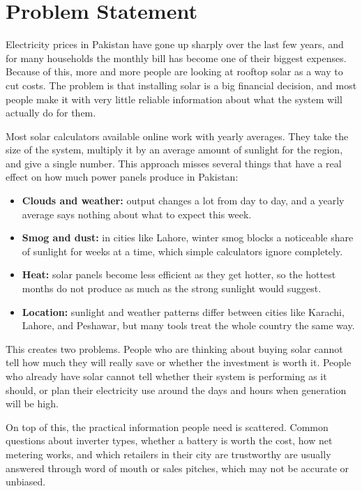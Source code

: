 \documentclass[11pt,a4paper]{article}
\begin{document}
\section{Problem Statement}

Electricity prices in Pakistan have gone up sharply over the last few years, and for many households the monthly bill has become one of their biggest expenses. Because of this, more and more people are looking at rooftop solar as a way to cut costs. The problem is that installing solar is a big financial decision, and most people make it with very little reliable information about what the system will actually do for them.
 
Most solar calculators available online work with yearly averages. They take the size of the system, multiply it by an average amount of sunlight for the region, and give a single number. This approach misses several things that have a real effect on how much power panels produce in Pakistan:
 
\begin{itemize}
    \item \textbf{Clouds and weather:} output changes a lot from day to day, and a yearly average says nothing about what to expect this week.
    \item \textbf{Smog and dust:} in cities like Lahore, winter smog blocks a noticeable share of sunlight for weeks at a time, which simple calculators ignore completely.
    \item \textbf{Heat:} solar panels become less efficient as they get hotter, so the hottest months do not produce as much as the strong sunlight would suggest.
    \item \textbf{Location:} sunlight and weather patterns differ between cities like Karachi, Lahore, and Peshawar, but many tools treat the whole country the same way.
\end{itemize}
 
This creates two problems. People who are thinking about buying solar cannot tell how much they will really save or whether the investment is worth it. People who already have solar cannot tell whether their system is performing as it should, or plan their electricity use around the days and hours when generation will be high.
 
On top of this, the practical information people need is scattered. Common questions about inverter types, whether a battery is worth the cost, how net metering works, and which retailers in their city are trustworthy are usually answered through word of mouth or sales pitches, which may not be accurate or unbiased.
 
\end{document}
